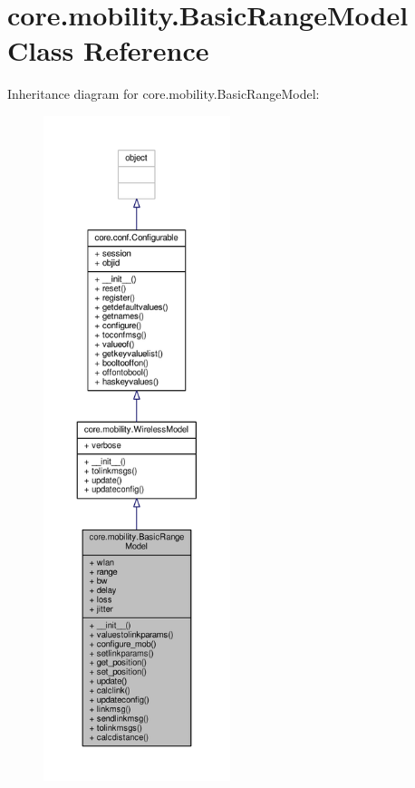 \hypertarget{classcore_1_1mobility_1_1_basic_range_model}{\section{core.\+mobility.\+Basic\+Range\+Model Class Reference}
\label{classcore_1_1mobility_1_1_basic_range_model}
}


Inheritance diagram for core.\+mobility.\+Basic\+Range\+Model\+:
\nopagebreak
\begin{figure}[H]
\begin{center}
\leavevmode
\includegraphics[height=550pt]{classcore_1_1mobility_1_1_basic_range_model__inherit__graph}
\end{center}
\end{figure}


